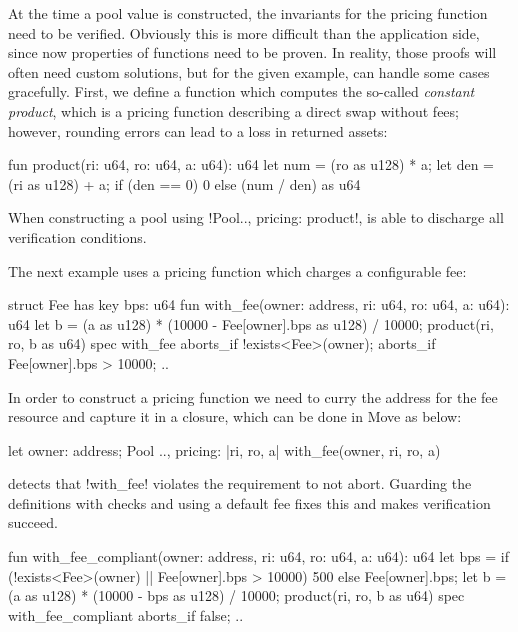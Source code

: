 At the time a pool value is constructed, the invariants for the pricing function need to be verified.
Obviously this is more difficult than the application side, since now properties of functions need to be proven.
In reality, those proofs will often need custom solutions, but for the given example, \MVP can handle some cases gracefully.
First, we define a function which computes the so-called \emph{constant product}, which is a pricing function describing a direct swap without fees; however, rounding errors can lead to a loss in returned assets:

\begin{MoveBox}
  fun product(ri: u64, ro: u64, a: u64): u64 {
    let num = (ro as u128) * a;
    let den = (ri as u128) + a;
    if (den == 0) 0 else (num / den) as u64
  }
\end{MoveBox}

\noindent When constructing a pool using !Pool{.., pricing: product}!, \MVP is able to discharge all verification conditions.

The next example uses a pricing function which charges a configurable fee:

\begin{MoveBox}
  struct Fee has key {bps: u64}
  fun with_fee(owner: address,
               ri: u64, ro: u64, a: u64): u64 {
    let b = (a as u128)
       * (10000 - Fee[owner].bps as u128) / 10000;
    product(ri, ro, b as u64)
  }
  spec with_fee {
    aborts_if !exists<Fee>(owner);
    aborts_if Fee[owner].bps > 10000;
    ..
  }
\end{MoveBox}

\noindent In order to construct a pricing function we need to curry the address for the fee resource and capture it in a closure, which can be done in Move as below:

\begin{MoveBox}
    let owner: address;
    Pool{
      ..,
      pricing: |ri, ro, a|
        with_fee(owner, ri, ro, a)
    }
\end{MoveBox}

\noindent \MVP detects that !with_fee! violates the requirement to not abort.
Guarding the definitions with checks and using a default fee fixes this and makes verification succeed.

\begin{MoveBox}
  fun with_fee_compliant(owner: address,
               ri: u64, ro: u64, a: u64): u64 {
    let bps =
      if (!exists<Fee>(owner)
          || Fee[owner].bps > 10000)
        500
      else
        Fee[owner].bps;
    let b =
        (a as u128) * (10000 - bps as u128) / 10000;
    product(ri, ro, b as u64)
  }
  spec with_fee_compliant {
    aborts_if false;
    ..
  }
\end{MoveBox}

